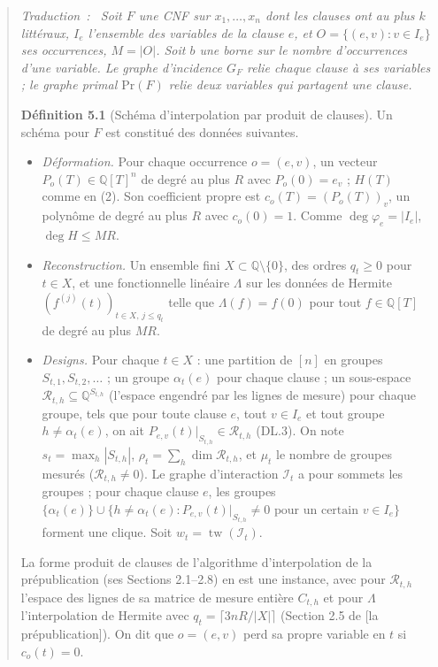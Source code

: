 \documentclass[11pt,a4paper]{article}
\theoremstyle{definition}
\theoremstyle{remark}
\newcommand{\Q}{\mathbb{Q}}
\newcommand{\cR}{\mathcal{R}}
\newcommand{\cI}{\mathcal{I}}
\newcommand{\tw}{\operatorname{tw}}
\newenvironment{dltrad}{\begin{quote}\itshape\textup{Traduction~:}\ \ignorespaces}{\end{quote}}
\begin{document}
\begin{dltrad}
Soit $F$ une CNF sur $x_1,\dots,x_n$ dont les clauses ont au plus $k$ littéraux, $I_e$
l'ensemble des variables de la clause $e$, et $O=\{(e,v):v\in I_e\}$ ses occurrences,
$M=|O|$. Soit $b$ une borne sur le nombre d'occurrences d'une variable. Le graphe
d'incidence $G_F$ relie chaque clause à ses variables ; le graphe primal $\mathrm{Pr}(F)$
relie deux variables qui partagent une clause.

\textbf{Définition 5.1} (Schéma d'interpolation par produit de clauses). Un schéma pour $F$
est constitué des données suivantes.
\begin{itemize}
\item[(a)] \emph{Déformation.} Pour chaque occurrence $o=(e,v)$, un vecteur
 $P_o(T)\in\Q[T]^n$ de degré au plus $R$ avec $P_o(0)=e_v$ ; $H(T)$ comme en (2). Son
 coefficient propre est $c_o(T)=(P_o(T))_v$, un polynôme de degré au plus $R$ avec
 $c_o(0)=1$. Comme $\deg\varphi_e=|I_e|$, $\deg H\le MR$.
\item[(b)] \emph{Reconstruction.} Un ensemble fini $X\subset\Q\setminus\{0\}$, des ordres
 $q_t\ge0$ pour $t\in X$, et une fonctionnelle linéaire $\Lambda$ sur les données de Hermite
 $(f^{(j)}(t))_{t\in X,\,j\le q_t}$ telle que $\Lambda(f)=f(0)$ pour tout $f\in\Q[T]$ de
 degré au plus $MR$.
\item[(c)] \emph{Designs.} Pour chaque $t\in X$ : une partition de $[n]$ en groupes
 $S_{t,1},S_{t,2},\dots$ ; un groupe $\alpha_t(e)$ pour chaque clause ; un sous-espace
 $\cR_{t,h}\subseteq\Q^{S_{t,h}}$ (l'espace engendré par les lignes de mesure) pour chaque
 groupe, tels que pour toute clause $e$, tout $v\in I_e$ et tout groupe $h\ne\alpha_t(e)$,
 on ait $P_{e,v}(t)\big|_{S_{t,h}}\in\cR_{t,h}$ \textup{(DL.3)}.
 On note $s_t=\max_h|S_{t,h}|$, $\rho_t=\sum_h\dim\cR_{t,h}$, et $\mu_t$ le nombre de
 groupes mesurés ($\cR_{t,h}\neq0$). Le graphe d'interaction $\cI_t$ a pour sommets les
 groupes ; pour chaque clause $e$, les groupes
 $\{\alpha_t(e)\}\cup\{h\ne\alpha_t(e):P_{e,v}(t)|_{S_{t,h}}\ne0\text{ pour un certain }v\in I_e\}$
 forment une clique. Soit $w_t=\tw(\cI_t)$.
\end{itemize}
La forme produit de clauses de l'algorithme d'interpolation de la prépublication (ses
Sections 2.1--2.8) en est une instance, avec pour $\cR_{t,h}$ l'espace des lignes de sa
matrice de mesure entière $C_{t,h}$ et pour $\Lambda$ l'interpolation de Hermite avec
$q_t=\lceil 3nR/|X|\rceil$ (Section 2.5 de [la prépublication]). On dit que $o=(e,v)$ perd
sa propre variable en $t$ si $c_o(t)=0$.
\end{dltrad}
\end{document}
